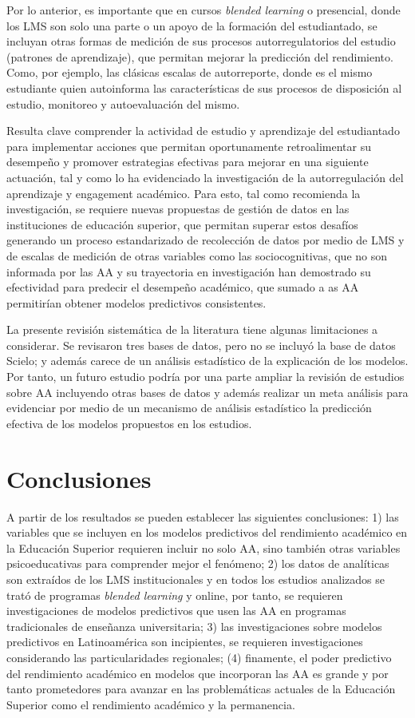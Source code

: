 \documentclass[spanish]{textolivre}
\begin{document}
Por lo anterior, es importante que en cursos \emph{blended learning} o presencial, donde los LMS son solo una parte o un apoyo de la formación del estudiantado, se incluyan otras formas de medición de sus procesos autorregulatorios del estudio (patrones de aprendizaje), que permitan mejorar la predicción del rendimiento. Como, por ejemplo, las clásicas escalas de autorreporte, donde es el mismo estudiante quien autoinforma las características de sus procesos de disposición al estudio, monitoreo y autoevaluación del mismo.

Resulta clave comprender la actividad de estudio y aprendizaje del estudiantado para implementar acciones que permitan oportunamente retroalimentar su desempeño y promover estrategias efectivas para mejorar en una siguiente actuación, tal y como lo ha evidenciado la investigación de la autorregulación del aprendizaje y engagement académico. Para esto, tal como recomienda la investigación, se requiere nuevas propuestas de gestión de datos en las instituciones de educación superior, que permitan superar estos desafíos generando un proceso estandarizado de recolección de datos por medio de LMS y de escalas de medición de otras variables como las sociocognitivas, que no son informada por las AA y su trayectoria en investigación han demostrado su efectividad para predecir el desempeño académico, que sumado a as AA permitirían obtener modelos predictivos consistentes.

La presente revisión sistemática de la literatura tiene algunas limitaciones a considerar. Se revisaron tres bases de datos, pero no se incluyó la base de datos Scielo; y además carece de un análisis estadístico de la explicación de los modelos. Por tanto, un futuro estudio podría por una parte ampliar la revisión de estudios sobre AA incluyendo otras bases de datos y además realizar un meta análisis para evidenciar por medio de un mecanismo de análisis estadístico la predicción efectiva de los modelos propuestos en los estudios.

\section{Conclusiones}
A partir de los resultados se pueden establecer las siguientes conclusiones: 1) las variables que se incluyen en los modelos predictivos del rendimiento académico en la Educación Superior requieren incluir no solo AA, sino también otras variables psicoeducativas para comprender mejor el fenómeno; 2) los datos de analíticas son extraídos de los LMS institucionales y en todos los estudios analizados se trató de programas \emph{blended learning} y online, por tanto, se requieren investigaciones de modelos predictivos que usen las AA en programas tradicionales de enseñanza universitaria; 3) las investigaciones sobre modelos predictivos en Latinoamérica son incipientes, se requieren investigaciones considerando las particularidades regionales; (4) finamente, el poder predictivo del rendimiento académico en modelos que incorporan las AA es grande y por tanto prometedores para avanzar en las problemáticas actuales de la Educación Superior como el rendimiento académico y la permanencia.
\end{document}
